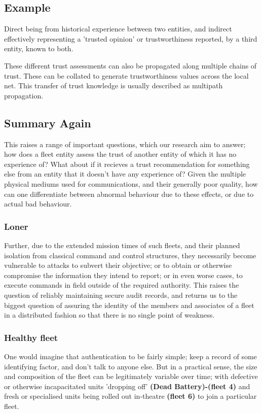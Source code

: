 \documentclass[oneside,11pt,a4paper]{Latex/Classes/PhDthesisPSnPDF}
\begin{document}
\begin{doublespace}
\subsection{Example}
Direct being from historical
experience between two entities, and indirect effectively representing a
'trusted opinion'  or trustworthiness reported, by a third entity, known to
both.

These different trust assessments can also be propagated along
multiple chains of trust. These can be collated to generate trustworthiness
values across the local net. This transfer of trust knowledge is
usually described as multipath propagation.

\subsection{Summary Again}
This raises a range of important questions, which our research aim to answer;
how does a fleet entity assess the trust of another entity of which it has no
experience of? What about if it recieves a trust recommendation for something
else from an entity that it doesn't have any experience of? Given the multiple
physical mediums used for communications, and their generally poor quality, how
can one differentiate between abnormal behaviour due to these effects, or due to
actual bad behaviour.

\subsubsection{Loner}  Further, due to the extended mission times of such
fleets, and their planned isolation from classical command and control structures, they
necessarily become vulnerable to attacks to subvert their objective; or to
obtain or otherwise compromise the information they intend to report; or in
even worse cases, to execute commands in field outside of the required
authority. This raises the question of reliably maintaining secure audit
records, and returns us to the biggest question of assuring the identity of the
members and associates of a fleet in a distributed fashion so that there is no
single point of weakness.

\subsubsection{Healthy fleet}  One would imagine that authentication to be
fairly simple; keep a record of some identifying factor, and don't talk to
anyone else. But in a practical sense, the size and composition of the fleet
can be legitimately variable over time; with defective or otherwise
incapacitated units 'dropping off' \textbf{(Dead Battery)-(fleet 4)} and fresh
or specialised units being rolled out in-theatre \textbf{(fleet 6)} to join a
particular fleet.


\end{doublespace}
\end{document}
